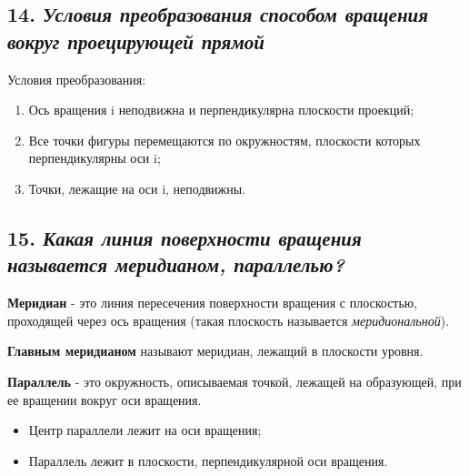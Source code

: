 
\newpage
\subsection*{14. \textit{Условия преобразования способом вращения вокруг проецирующей прямой}}

\begin{mainQuote}
    
\end{mainQuote}

Условия преобразования:
\begin{enumerate}
    \item Ось вращения i неподвижна и перпендикулярна плоскости проекций;
    \item Все точки фигуры перемещаются по окружностям, плоскости которых перпендикулярны оси i;
    \item Точки, лежащие на оси i, неподвижны.
\end{enumerate}


\newpage
\subsection*{15. \textit{Какая линия поверхности вращения называется меридианом, параллелью?}}

\begin{mainQuote}
\end{mainQuote}
{\bf Меридиан} - это линия пересечения поверхности вращения с плоскостью, проходящей через ось вращения (такая плоскость называется \textit {меридиональной}).

{\bf Главным меридианом} называют меридиан, лежащий в плоскости уровня.

{\bf Параллель} - это окружность, описываемая точкой, лежащей на образующей, при ее вращении вокруг оси вращения. 
\begin{itemize}
    \item Центр параллели лежит на оси вращения; 
    \item Параллель лежит в плоскости, перпендикулярной оси вращения.
\end{itemize}

